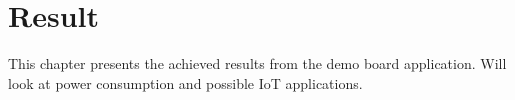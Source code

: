\chapter{Result}

This chapter presents the achieved results from the demo board application. Will look at power consumption and possible IoT applications.
